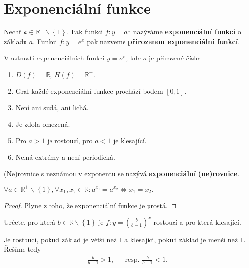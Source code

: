 \section{Exponenciální funkce}
\begin{definition}
    Nechť $a\in \mathbb R^+ \smallsetminus \left \{ 1 \right \}. $ Pak funkci $f:y=a^x$
    nazýváme \textbf{exponenciální funkcí} o základu $a$. Funkci $f:y=e^x$ pak
    nazveme \textbf{přirozenou exponenciální funkcí}.
\end{definition}

\begin{veta}
    Vlastnosti exponenciálních funkcí $y= a^x$, kde $a$ je přirozené číslo:
    \begin{enumerate}[$i.$]
        \item $D(f)= \mathbb R$, $H(f)= \mathbb R^+$.
       	\item Graf každé exponenciální funkce prochází bodem $[0,1].$
        \item Není ani sudá, ani lichá.
        \item Je zdola omezená.
        \item Pro $a >1$ je rostoucí, pro $a<1$ je klesající.
        \item Nemá extrémy a není periodická.
    \end{enumerate}
\end{veta}

\begin{definition}
    (Ne)rovnice s neznámou v exponentu se nazývá \textbf{exponenciální (ne)rovnice}.
\end{definition}

\begin{veta}
    $\forall a \in \mathbb R^+ \smallsetminus \left \{ 1 \right \}, \forall x_1, x_2
    \in \mathbb R: a^{x_1}=a^{x_2}\iff x_1=x_2.$
\end{veta}

\begin{proof}
    Plyne z toho, že exponenciální funkce je prostá.
\end{proof}

\begin{priklad}
Určete, pro která $b\in \mathbb R\smallsetminus\left \{ 1 \right \} $ je $f:y=\left ( \frac{b}{b-1} \right )^x $
rostoucí a pro která klesající.
\end{priklad}

\begin{reseni}
Je rostoucí, pokud základ je větší než 1 a klesající, pokud základ je menší než 1.
Řešíme tedy
\begin{align*}
\frac{b}{b-1}>1, & & \textrm{resp. } \frac{b}{b-1}<1.
\end{align*}
\end{reseni}

